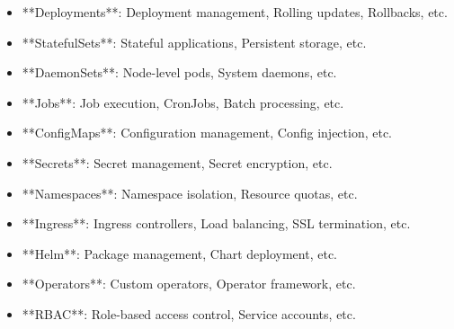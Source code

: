 \documentclass[11pt,a4paper]{article}
\begin{document}
\begin{itemize}
\item **Deployments**: Deployment management, Rolling updates, Rollbacks, etc.
\end{itemize}

\begin{itemize}
\item **StatefulSets**: Stateful applications, Persistent storage, etc.
\end{itemize}

\begin{itemize}
\item **DaemonSets**: Node-level pods, System daemons, etc.
\end{itemize}

\begin{itemize}
\item **Jobs**: Job execution, CronJobs, Batch processing, etc.
\end{itemize}

\begin{itemize}
\item **ConfigMaps**: Configuration management, Config injection, etc.
\end{itemize}

\begin{itemize}
\item **Secrets**: Secret management, Secret encryption, etc.
\end{itemize}

\begin{itemize}
\item **Namespaces**: Namespace isolation, Resource quotas, etc.
\end{itemize}

\begin{itemize}
\item **Ingress**: Ingress controllers, Load balancing, SSL termination, etc.
\end{itemize}

\begin{itemize}
\item **Helm**: Package management, Chart deployment, etc.
\end{itemize}

\begin{itemize}
\item **Operators**: Custom operators, Operator framework, etc.
\end{itemize}

\begin{itemize}
\item **RBAC**: Role-based access control, Service accounts, etc.
\end{itemize}
\end{document}
